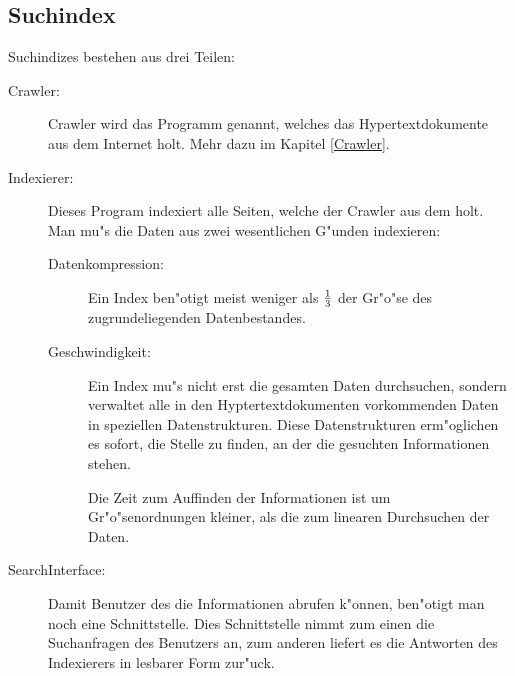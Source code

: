 \subsection{Suchindex}
Suchindizes bestehen aus drei Teilen:
\begin{description}
\item[Crawler:]		Crawler wird das Programm genannt, welches das Hypertextdokumente aus dem Internet holt. Mehr dazu im Kapitel \ref{Crawler}.
\item[Indexierer:]	Dieses Program indexiert alle Seiten, welche der Crawler aus dem \www holt. Man mu"s die Daten aus zwei wesentlichen G"unden indexieren:
	\begin{description}
		\item[Datenkompression:] 	Ein Index ben"otigt meist weniger als $1\over 3$ der Gr"o"se des zugrundeliegenden Datenbestandes.
		\item[Geschwindigkeit:]		Ein Index mu"s nicht erst die gesamten Daten durchsuchen, sondern verwaltet alle in den Hyptertextdokumenten vorkommenden Daten in speziellen Datenstrukturen. Diese Datenstrukturen erm"oglichen es sofort, die Stelle zu finden, an der die gesuchten Informationen stehen.
		
		Die Zeit zum Auf\/finden der Informationen ist um Gr"o"senordnungen kleiner, als die zum linearen Durchsuchen der Daten.
	\end{description}
\item[SearchInterface:]	Damit Benutzer des \www die Informationen abrufen k"onnen, ben"otigt man noch eine Schnittstelle. Dies Schnittstelle nimmt zum einen die Suchanfragen des Benutzers an, zum anderen liefert es die Antworten des Indexierers in lesbarer Form zur"uck.
\end{description}